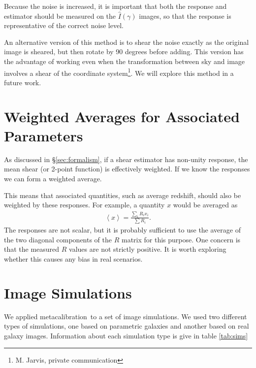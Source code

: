\documentclass[iop]{emulateapj}
\newcommand{\mcal}{metacalibration}
\begin{document}
Because the noise is increased, it is important that both the response and
estimator should be measured on the $\hat{I}(\gamma)$ images, so that the
response is representative of the correct noise level.

An alternative version of this method is to shear the noise exactly as the
original image is sheared, but then rotate by 90 degrees before adding.  This
version has the advantage of working even when the transformation between sky
and image involves a shear of the coordinate system\footnote{M. Jarvis, private
communication}. We will explore this method in a future work.

\section{Weighted Averages for Associated Parameters} \label{sec:weighting}

As discussed in \S \ref{sec:formalism}, if a shear estimator has
non-unity response, the mean shear (or 2-point function) is effectively
weighted.  If we know the responses we can form a weighted average.

This means that associated quantities, such as average redshift, should also be
weighted by these responses.  For example, a quantity $x$ would be averaged
as
\begin{align}
    \left< x \right> = \frac{\sum_i R_i x_i}{\sum R_i}.
\end{align}
The responses are not scalar, but it is probably sufficient
to use the average of the two diagonal components of the $R$ matrix
for this purpose. One concern is that the measured $R$ values are not
strictly positive.  It is worth exploring whether this causes
any bias in real scenarios.

\section{Image Simulations} \label{sec:sims}

We applied \mcal\ to a set of image simulations.  We used two different
types of simulations, one based on parametric galaxies and another
based on real galaxy images.  Information about each simulation type
is give in table \ref{tab:sims}
\end{document}
